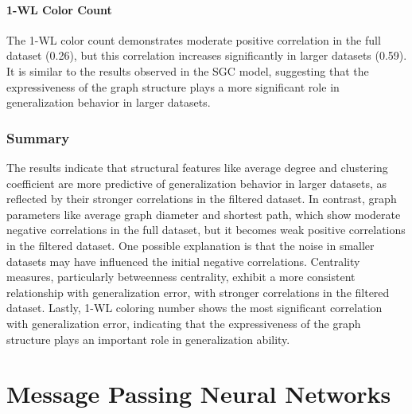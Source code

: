 \paragraph{1-WL Color Count}
The 1-WL color count demonstrates moderate positive correlation in the full dataset (0.26), but this correlation increases significantly in larger datasets (0.59). It is similar to the results observed in the SGC model, suggesting that the expressiveness of the graph structure plays a more significant role in generalization behavior in larger datasets.

\subsubsection{Summary}
The results indicate that structural features like average degree and clustering coefficient are more predictive of generalization behavior in larger datasets, as reflected by their stronger correlations in the filtered dataset. In contrast, graph parameters like average graph diameter and shortest path, which show moderate negative correlations in the full dataset, but it becomes weak positive correlations in the filtered dataset. One possible explanation is that the noise in smaller datasets may have influenced the initial negative correlations. Centrality measures, particularly betweenness centrality, exhibit a more consistent relationship with generalization error, with stronger correlations in the filtered dataset. Lastly, 1-WL coloring number shows the most significant correlation with generalization error, indicating that the expressiveness of the graph structure plays an important role in generalization ability.

\section{Message Passing Neural Networks}~\label{sec:result_mpnn}